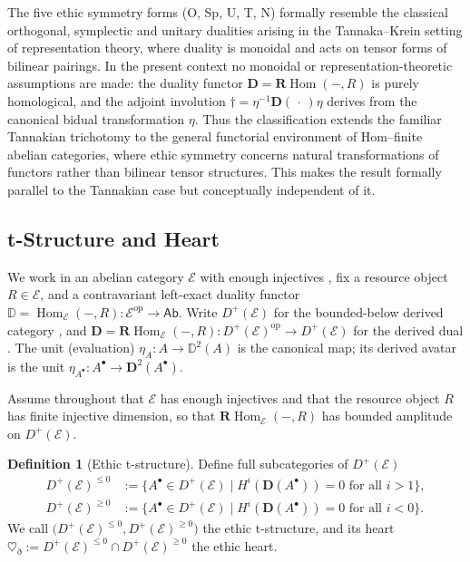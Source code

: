 \documentclass[12pt]{article}
\newcommand{\E}{\mathcal{E}}
\newcommand{\DD}{\mathbb{D}}
\newcommand{\Hom}{\operatorname{Hom}}
\newcommand{\op}{\mathrm{op}}
\newcommand{\RHom}{\mathbf{R}\!\operatorname{Hom}}
\newcommand{\Dplus}{D^{+}}
\theoremstyle{plain}
\theoremstyle{definition}
\newtheorem{definition}[theorem]{Definition}
\theoremstyle{remark}
\numberwithin{equation}{section}
\begin{document}
The five ethic symmetry forms (O, Sp, U, T, N) formally resemble the classical orthogonal, symplectic and unitary dualities arising in the Tannaka–Krein setting of representation theory, where duality is monoidal and acts on tensor forms of bilinear pairings.  
In the present context no monoidal or representation-theoretic assumptions are made: the duality functor $\mathbf D=\RHom(-,R)$ is purely homological, and the adjoint involution $\dagger=\eta^{-1}\mathbf D(\,\cdot\,)\eta$ derives from the canonical bidual transformation $\eta$.  
Thus the classification extends the familiar Tannakian trichotomy to the general functorial environment of Hom–finite abelian categories, where ethic symmetry concerns natural transformations of functors rather than bilinear tensor structures.  
This makes the result formally parallel to the Tannakian case but conceptually independent of it.

\subsection{t-Structure and Heart}\label{sec:ethic-t-structure}

We work in an abelian category \(\E\) with enough injectives \cite{Weibel1994}, fix a resource object \(R\in \E\), and a contravariant left-exact duality functor
\(\DD=\Hom_{\E}(-,R):\E^{\op}\to \mathsf{Ab}\).
Write \(\Dplus(\E)\) for the bounded-below derived category \cite{Verdier1967}, and \(\mathbf D=\RHom_{\E}(-,R):\Dplus(\E)^{\op}\to \Dplus(\E)\) for the derived dual \cite{GelfandManin2003}. The unit (evaluation) \(\eta_A:A\to \DD^2(A)\) is the canonical map; its derived avatar is the unit \(\eta_{A^\bullet}:A^\bullet\to \mathbf D^2(A^\bullet)\).

Assume throughout that $\E$ has enough injectives and
that the resource object $R$ has finite injective dimension,
so that $\RHom_\E(-,R)$ has bounded amplitude on $\Dplus(\E)$.

\begin{definition}[Ethic t-structure]\label{def:EthicT}
Define full subcategories of \(\Dplus(\E)\)
\begin{align*}
\Dplus(\E)^{\le 0} &:= \{A^\bullet\in \Dplus(\E)\mid H^i(\mathbf D(A^\bullet))=0 \text{ for all } i>1\},\\
\Dplus(\E)^{\ge 0} &:= \{A^\bullet\in \Dplus(\E)\mid H^i(\mathbf D(A^\bullet))=0 \text{ for all } i<0\}.
\end{align*}
We call \(\big(\Dplus(\E)^{\le0},\Dplus(\E)^{\ge0}\big)\) the ethic t-structure, and its heart
\(\heartsuit_{\eth} := \Dplus(\E)^{\le0}\cap \Dplus(\E)^{\ge0}\) the ethic heart.
\end{definition}
\end{document}
